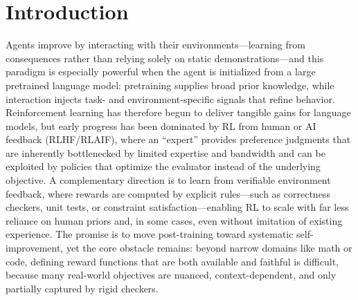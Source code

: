\section{Introduction}


Agents improve by interacting with their environments—learning from consequences rather than relying solely on static demonstrations—and this paradigm is especially powerful when the agent is initialized from a large pretrained language model: pretraining supplies broad prior knowledge, while interaction injects task- and environment-specific signals that refine behavior. Reinforcement learning has therefore begun to deliver tangible gains for language models, but early progress has been dominated by RL from human or AI feedback (RLHF/RLAIF), where an “expert” provides preference judgments that are inherently bottlenecked by limited expertise and bandwidth and can be exploited by policies that optimize the evaluator instead of the underlying objective. A complementary direction is to learn from verifiable environment feedback, where rewards are computed by explicit rules—such as correctness checkers, unit tests, or constraint satisfaction—enabling RL to scale with far less reliance on human priors and, in some cases, even without imitation of existing experience. The promise is to move post-training toward systematic self-improvement, yet the core obstacle remains: beyond narrow domains like math or code, defining reward functions that are both available and faithful is difficult, because many real-world objectives are nuanced, context-dependent, and only partially captured by rigid checkers.

